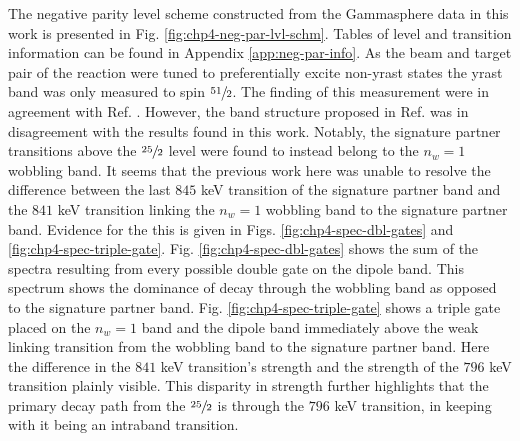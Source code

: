 The negative parity level scheme constructed from the Gammasphere data in this work is presented in Fig. \ref{fig:chp4-neg-par-lvl-schm}. Tables of level and transition information can be found in Appendix \ref{app:neg-par-info}. As the beam and target pair of the reaction were tuned to preferentially excite non-yrast states the yrast band was only measured to spin $\sfrac{51}{2}$. The finding of this measurement were in agreement with Ref. \cite{ePaul135Pr}. However, the band structure proposed in Ref. \cite{semkow135Pr} was in disagreement with the results found in this work. Notably, the signature partner transitions above the $\sfrac{25}{2}$ level were found to instead belong to the $n_w=1$ wobbling band. It seems that the previous work here was unable to resolve the difference between the last $845$ keV transition of the signature partner band and the $841$ keV transition linking the $n_w=1$ wobbling band to the signature partner band. Evidence for the this is given in Figs. \ref{fig:chp4-spec-dbl-gates} and \ref{fig:chp4-spec-triple-gate}. Fig. \ref{fig:chp4-spec-dbl-gates} shows the sum of the spectra resulting from every possible double gate on the dipole band. This spectrum shows the dominance of decay through the wobbling band as opposed to the signature partner band. Fig. \ref{fig:chp4-spec-triple-gate} shows a triple gate placed on the $n_w=1$ band and the dipole band immediately above the weak linking transition from the wobbling band to the signature partner band. Here the difference in the $841$ keV transition's strength and the strength of the $796$ keV transition plainly visible. This disparity in strength further highlights that the primary decay path from the $\sfrac{25}{2}$ is through the $796$ keV transition, in keeping with it being an intraband transition.


